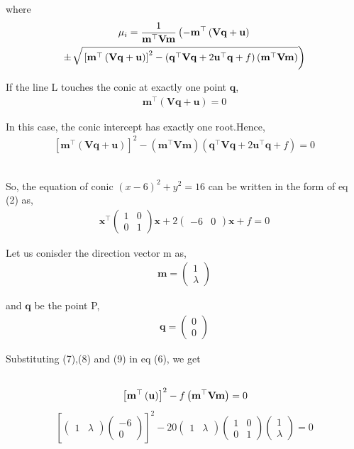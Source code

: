 \documentclass[a4paper,10pt]{report}
\newcommand{\myvec}[1]{\ensuremath{\begin{pmatrix}#1\end{pmatrix}}}
\let\vec\mathbf
\providecommand{\sbrak}[1]{\ensuremath{{}\left[#1\right]}}
\providecommand{\brak}[1]{\ensuremath{\left(#1\right)}}
\providecommand{\lbrak}[1]{\ensuremath{\left(#1\right.}}
\providecommand{\rbrak}[1]{\ensuremath{\left.#1\right)}}
\begin{document}
\begin{multicols}{2}
where
\begin{multline}
\mu_i = \frac{1}
{
\vec{m}^{\top}\vec{V}\vec{m}
}
\lbrak{-\vec{m}^{\top}\brak{\vec{V}\vec{q}+\vec{u}}}
\\
\pm
{\small
\rbrak{\sqrt{
\sbrak{
\vec{m}^{\top}\brak{\vec{V}\vec{q}+\vec{u}}
}^2
-
\brak
{
\vec{q}^{\top}\vec{V}\vec{q} + 2\vec{u}^{\top}\vec{q} +f
}
\brak{\vec{m}^{\top}\vec{V}\vec{m}}
}
}
}
\end{multline}
\raggedright\large{If the line L touches the conic at exactly one point $\vec{q}$,}
\begin{align}
\vec{m}^{\top}\brak{\vec{V}\vec{q}+\vec{u}} = 0
\end{align}
\raggedright{In this case, the conic intercept has exactly one root.Hence,}
\begin{align}
  \sbrak{
  \vec{m}^{\top}\brak{\vec{V}\vec{q}+\vec{u}}
  }^2 -\brak{\vec{m}^{\top}\vec{V}\vec{m}}
  \brak
  {
  \vec{q}^{\top}\vec{V}\vec{q} + 2\vec{u}^{\top}\vec{q} +f
  } = 0                                                                                             
\end{align}\vspace{0.5cm}\\
\raggedright\large{So, the equation of conic  $(x-6)^2 + y^2 = 16$ can be written in the form of eq (2) as,}
\begin{align}
\vec{x}^{\top}\myvec{1&0\\0&1}\vec{x}+2\myvec{-6&0}\vec{x}+f=0
\end{align}
\raggedright\large{Let us conisder the direction vector m as,}
\begin{align}
\vec{m}=\myvec{1\\ \lambda}
\end{align}
\raggedright\large{and $\vec{q}$ be the point P,}
\begin{align}
\vec{q}=\myvec{0\\0}
\end{align}
\raggedright\large{Substituting (7),(8) and (9) in eq (6), we get}
\begin{align*}\vspace{0.5cm}\\
\sbrak{\vec{m}^{\top}\brak{\vec{u}}}^2 - f\brak{\vec{m}^{\top}\vec{V}\vec{m}}=0
\end{align*}
\begin{gather*}
\sbrak{\myvec{1& \lambda}\myvec{-6\\0}}^2 - 20\myvec{1 & \lambda}\myvec{1&0\\0&1}\myvec{1\\ \lambda}=0\\

\end{gather*}
\end{multicols}
\end{document}
